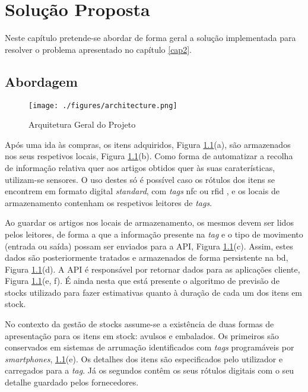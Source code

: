 %
%
\chapter{Solução Proposta} \label{cap3}

Neste capítulo pretende-se abordar de forma geral a solução implementada para resolver o problema apresentado no capítulo \ref{cap2}.

%
%
\section{Abordagem}\label{sec31}

\begin{figure}[H]
	\centering
	\texttt{[image: ./figures/architecture.png]}
	\caption{Arquitetura Geral do Projeto}
	\label{project-general-architecture}
\end{figure}

Após uma ida às compras, os itens adquiridos, Figura \ref{project-general-architecture}(a), são armazenados nos seus respetivos locais, Figura \ref{project-general-architecture}(b). Como forma de automatizar a recolha de informação relativa quer aos artigos obtidos quer às suas caraterísticas, utilizam-se sensores. O uso destes só é possível caso os rótulos dos itens se encontrem em formato digital \textit{standard}, com \textit{tags} \acrfull{nfc} \cite{nfcforum:nfc} ou \acrfull{rfid} \cite{rfidinc:rfid}, e os locais de armazenamento contenham os respetivos leitores de \textit{tags}.

Ao guardar os artigos nos locais de armazenamento, os mesmos devem ser lidos pelos leitores, de forma a que a informação presente na \textit{tag} e o tipo de movimento (entrada ou saída) possam ser enviados para a API, Figura \ref{project-general-architecture}(c). Assim, estes dados são posteriormente tratados e armazenados de forma persistente na \acrfull{bd}, Figura \ref{project-general-architecture}(d). A API é responsável por retornar dados para as aplicações cliente, Figura \ref{project-general-architecture}(e, f). É ainda nesta que está presente o algoritmo de previsão de stocks utilizado para fazer estimativas quanto à duração de cada um dos itens em stock.

No contexto da gestão de stocks assume-se a existência de duas formas de apresentação para os itens em stock: avulsos e embalados. Os primeiros são conservados em sistemas de arrumação identificados com \textit{tags} programáveis por \textit{smartphones}, \ref{project-general-architecture}(e). Os detalhes dos itens são especificados pelo utilizador e carregados para a \textit{tag}. Já os segundos contêm os seus rótulos digitais com o seu detalhe guardado pelos fornecedores.\\

